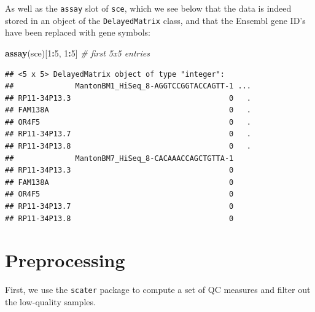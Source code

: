 \documentclass[]{book}
\newenvironment{Shaded}{\begin{snugshade}}{\end{snugshade}}
\newcommand{\CommentTok}[1]{\textcolor[rgb]{0.56,0.35,0.01}{\textit{#1}}}
\newcommand{\DataTypeTok}[1]{\textcolor[rgb]{0.13,0.29,0.53}{#1}}
\newcommand{\DecValTok}[1]{\textcolor[rgb]{0.00,0.00,0.81}{#1}}
\newcommand{\KeywordTok}[1]{\textcolor[rgb]{0.13,0.29,0.53}{\textbf{#1}}}
\newcommand{\NormalTok}[1]{#1}
\newcommand{\OperatorTok}[1]{\textcolor[rgb]{0.81,0.36,0.00}{\textbf{#1}}}
\newcommand{\OtherTok}[1]{\textcolor[rgb]{0.56,0.35,0.01}{#1}}
\newcommand{\StringTok}[1]{\textcolor[rgb]{0.31,0.60,0.02}{#1}}
\begin{document}
As well as the \texttt{assay} slot of \texttt{sce}, which we see below that the data is indeed stored in an object of the \texttt{DelayedMatrix} class, and that the Ensembl gene ID's have been replaced with gene symbols:

\begin{Shaded}
\begin{Highlighting}[]
\KeywordTok{assay}\NormalTok{(sce)[}\DecValTok{1}\OperatorTok{:}\DecValTok{5}\NormalTok{, }\DecValTok{1}\OperatorTok{:}\DecValTok{5}\NormalTok{] }\CommentTok{# first 5x5 entries}
\end{Highlighting}
\end{Shaded}

\begin{verbatim}
## <5 x 5> DelayedMatrix object of type "integer":
##              MantonBM1_HiSeq_8-AGGTCCGGTACCAGTT-1 ...
## RP11-34P13.3                                    0   .
## FAM138A                                         0   .
## OR4F5                                           0   .
## RP11-34P13.7                                    0   .
## RP11-34P13.8                                    0   .
##              MantonBM7_HiSeq_8-CACAAACCAGCTGTTA-1
## RP11-34P13.3                                    0
## FAM138A                                         0
## OR4F5                                           0
## RP11-34P13.7                                    0
## RP11-34P13.8                                    0
\end{verbatim}

\hypertarget{preprocessing}{%
\section{Preprocessing}\label{preprocessing}}

First, we use the \texttt{scater} package to compute a set of QC measures and filter out the low-quality samples.

\begin{Shaded}
\end{Shaded}
\end{document}
